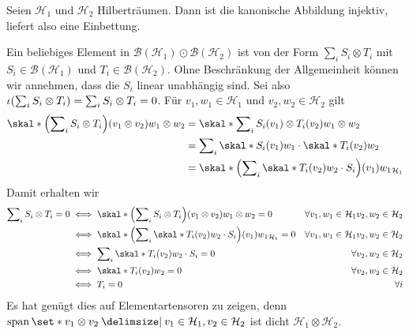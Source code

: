 Seien $\mathcal{H}_1$ und $\mathcal{H}_2$ Hilberträumen.
Dann ist die kanonische Abbildung
injektiv, liefert also eine Einbettung.
\begin{beweis}
	Ein beliebiges Element in $\mathcal{B}(\mathcal{H}_1) \odot \mathcal{B}(\mathcal{H}_2)$ ist von der Form $\sum_{i} S_i \otimes T_i$ mit
	$S_i \in \mathcal{B}(\mathcal{H}_1)$ und $T_i \in \mathcal{B}(\mathcal{H}_2)$.
	Ohne Beschränkung der Allgemeinheit können wir annehmen, dass die $S_i$ linear unabhängig sind.
	Sei also $\iota \enbrace*{\sum_{i} S_i \otimes T_i}=\sum_{i} S_i \otimes T_i=0$.
	Für $v_1,w_1 \in \mathcal{H}_1$ und $v_2,w_2 \in \mathcal{H}_2$ gilt
	\begin{align}
		\skal*{\enbrace*{\sum\nolimits_{i} S_i \otimes T_i}(v_1 \otimes v_2)}{w_1 \otimes w_2} &= \skal*{\sum\nolimits_i S_i(v_1) \otimes T_i(v_2)}{w_1 \otimes w_2}\\
		&= \sum\nolimits_i \skal*{S_i(v_1)}{w_1} \cdot \skal*{T_i(v_2)}{w_2} \\
		&= \skal*{\enbrace*{\sum\nolimits_i \skal*{T_i (v_2)}{w_2} \cdot S_i}(v_1)}{w_1}_{\mathcal{H}_1}
	\end{align}
	Damit erhalten wir 
	\begin{align}
		\sum\nolimits_{i} S_i \otimes T_i =0 &\iff \skal*{\enbrace*{\sum\nolimits_{i} S_i \otimes T_i}(v_1 \otimes v_2)}{w_1 \otimes w_2} =0 & \forall v_1,w_1 \in \mathcal{H}_1 v_2,w_2 \in \mathcal{H}_2 \\
		&\iff \skal*{\enbrace*{\sum\nolimits_i \skal*{T_i (v_2)}{w_2} \cdot S_i}(v_1)}{w_1}_{\mathcal{H}_1} =0 & \forall v_1,w_1 \in \mathcal{H}_1 v_2,w_2 \in \mathcal{H}_2\\
		&\iff \sum\nolimits_i \skal*{T_i(v_2)}{w_2} \cdot S_i =0 & \forall v_2,w_2 \in \mathcal{H}_2 \\
		&\iff \skal*{T_i(v_2)}{w_2} =0 & \forall v_2,w_2 \in \mathcal{H}_2 \\
		&\iff T_i =0 & \forall i
	\end{align}
	Es hat genügt dies auf Elementartensoren zu zeigen, denn $\Span \set*{v_1 \otimes v_2 \given v_1 \in \mathcal{H}_1 , v_2 \in \mathcal{H}_2}$ ist dicht $\mathcal{H}_1 \otimes \mathcal{H}_2$.
\end{beweis}












